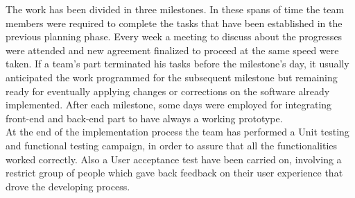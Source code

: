 The work has been divided in three milestones. In these spans of time the team members were required to complete the tasks that have been established in the previous planning phase. Every week a meeting to discuss about the progresses were attended and new agreement finalized to proceed at the same speed were taken. If a team’s part terminated his tasks before the milestone’s day, it usually anticipated the work programmed for the subsequent milestone but remaining ready for eventually applying changes or corrections on the software already implemented. After each milestone, some days were employed for integrating front-end and back-end part to have always a working prototype. \\
At the end of the implementation process the team has performed a Unit testing and functional testing campaign, in order to assure that all the functionalities worked correctly. Also a User acceptance test have been carried on, involving a restrict group of people which gave back feedback on their user experience that drove the developing process.

